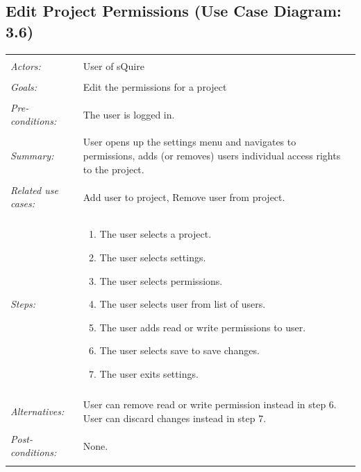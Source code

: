 \documentclass[11pt]{report}
\begin{document}
\subsection{Edit Project Permissions (Use Case Diagram: 3.6)}
\begin{tabular}{ p{2cm} p{12cm} }
 \hline
 \\
 \textit{Actors:} & User of sQuire \\ 
 \\
 \textit{Goals:} & Edit the permissions for a project \\
 \\
 \textit{Pre-conditions:} & The user is logged in. \\
 \\
 \textit{Summary:} & User opens up the settings menu and navigates to permissions, adds (or removes) users individual access rights to the project.  \\ 
 \\
 \textit{Related use cases:} & Add user to project, Remove user from project. \\ 
 \\
 \textit{Steps:} & \begin{enumerate}
  \item The user selects a project.
  \item The user selects settings.
  \item The user selects permissions.
  \item The user selects user from list of users.
  \item The user adds read or write permissions to user.
  \item The user selects save to save changes.
  \item The user exits settings.
 \end{enumerate} \\
 \\
 \textit{Alternatives:} & User can remove read or write permission instead in step 6. User can discard changes instead in step 7. \\
 \\
 \textit{Post-conditions:} & None. \\
 \\
\hline
\end{tabular}
\end{document}
